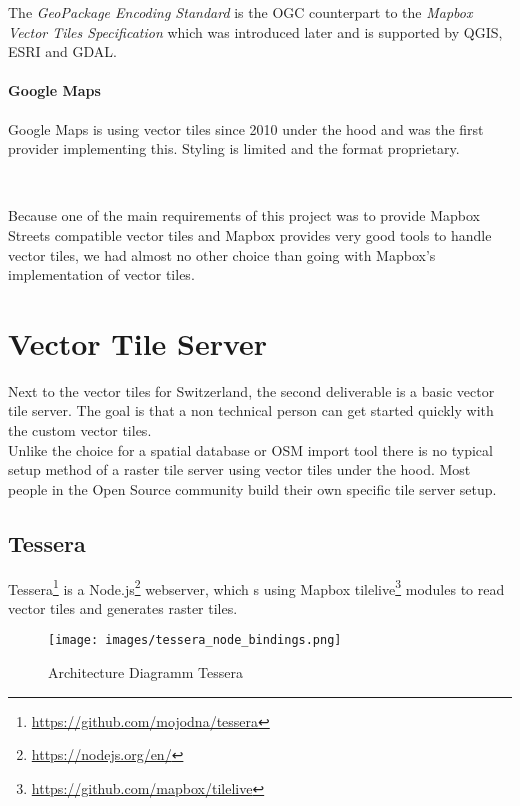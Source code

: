 The \emph{GeoPackage Encoding Standard} is the OGC counterpart to the
\emph{Mapbox Vector Tiles Specification} which was introduced later and
is supported by QGIS, ESRI and GDAL.

\paragraph{Google Maps}

Google Maps is using vector tiles since 2010 under the hood and was the
first provider implementing this. Styling is limited and the format
proprietary.

\\
\begin{tcolorbox}[arc=0mm,boxrule=1pt,title=Decision]\label{vector_tile_spec_impl_decision}
Because one of the main requirements of this project was to provide Mapbox Streets compatible vector tiles and Mapbox provides very good tools to handle vector tiles, we had almost no other choice than going with Mapbox's implementation of vector tiles.
\end{tcolorbox}

\section{Vector Tile Server}\label{vector_tile_server}

Next to the vector tiles for Switzerland, the second deliverable is a basic vector tile server. The goal is that a non technical person can get started quickly with the custom vector tiles.\\

Unlike the choice for a spatial database or OSM import tool
there is no typical setup method of a raster tile server using vector tiles under the hood. Most people in the Open Source community build their own specific tile server setup.

\subsection{Tessera}\label{tessera}

Tessera\footnote{\url{https://github.com/mojodna/tessera}} is a Node.js\footnote{\url{https://nodejs.org/en/}} webserver, which s using Mapbox tilelive\footnote{\url{https://github.com/mapbox/tilelive}} modules to read vector tiles and generates raster tiles.

\begin{figure}[H]
\centering
  \texttt{[image: images/tessera\_node\_bindings.png]}
  \caption{Architecture Diagramm Tessera}
\end{figure}

